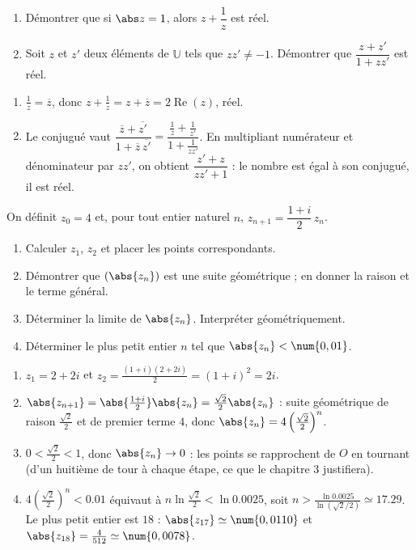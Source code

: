 \begin{exercise}
\begin{enumerate}
\item Démontrer que si $\abs z=1$, alors $z+\dfrac1z$ est réel.
\item Soit $z$ et $z'$ deux éléments de $\mathbb U$ tels que $zz'\neq-1$. Démontrer que $\dfrac{z+z'}{1+zz'}$ est réel.
\end{enumerate}
\end{exercise}
\begin{solution}
\begin{enumerate}
\item $\frac1z=\overline z$, donc $z+\frac1z=z+\overline z=2\operatorname{Re}(z)$, réel.
\item Le conjugué vaut $\dfrac{\overline z+\overline{z'}}{1+\overline z\,\overline{z'}}=\dfrac{\frac1z+\frac1{z'}}{1+\frac1{zz'}}$. En multipliant numérateur et dénominateur par $zz'$, on obtient $\dfrac{z'+z}{zz'+1}$ : le nombre est égal à son conjugué, il est réel.
\end{enumerate}
\end{solution}

\begin{exercise}
On définit $z_0=4$ et, pour tout entier naturel $n$, $z_{n+1}=\dfrac{1+i}2\,z_n$.
\begin{enumerate}
\item Calculer $z_1$, $z_2$ et placer les points correspondants.
\item Démontrer que $\left(\abs{z_n}\right)$ est une suite géométrique ; en donner la raison et le terme général.
\item Déterminer la limite de $\abs{z_n}$. Interpréter géométriquement.
\item Déterminer le plus petit entier $n$ tel que $\abs{z_n}<\num{0,01}$.
\end{enumerate}
\end{exercise}
\begin{solution}
\begin{enumerate}
\item $z_1=2+2i$ et $z_2=\frac{(1+i)(2+2i)}2=(1+i)^2=2i$.
\item $\abs{z_{n+1}}=\abs{\frac{1+i}2}\abs{z_n}=\frac{\sqrt2}2\abs{z_n}$ : suite géométrique de raison $\frac{\sqrt2}2$ et de premier terme $4$, donc $\abs{z_n}=4\left(\frac{\sqrt2}2\right)^n$.
\item $0<\frac{\sqrt2}2<1$, donc $\abs{z_n}\to0$ : les points se rapprochent de $O$ en tournant (d'un huitième de tour à chaque étape, ce que le chapitre 3 justifiera).
\item $4\left(\frac{\sqrt2}2\right)^n<\num{0,01}$ équivaut à $n\ln\frac{\sqrt2}2<\ln\num{0,0025}$, soit $n>\frac{\ln \num{0,0025}}{\ln(\sqrt2/2)}\simeq\num{17,29}$. Le plus petit entier est $18$ : $\abs{z_{17}}\simeq\num{0,0110}$ et $\abs{z_{18}}=\frac{4}{512}\simeq\num{0,0078}$.
\end{enumerate}
\end{solution}

